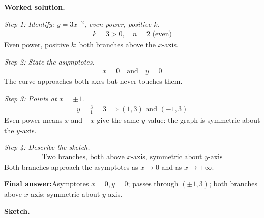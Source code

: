 \documentclass[11pt]{article}
\begin{document}
\textbf{Worked solution.}

\textit{Step 1: Identify: \( y = 3x^{-2} \), even power, positive \( k \).}
\[\begin{gathered}
k = 3 > 0, \quad n = 2 \text{ (even)}
\end{gathered}\]
Even power, positive \( k \): both branches above the \( x \)-axis.

\textit{Step 2: State the asymptotes.}
\[\begin{gathered}
x = 0 \quad \text{and} \quad y = 0
\end{gathered}\]
The curve approaches both axes but never touches them.

\textit{Step 3: Points at \( x = \pm 1 \).}
\[\begin{gathered}
y = \frac{3}{1} = 3 \implies (1, 3) \text{ and } (-1, 3)
\end{gathered}\]
Even power means \( x \) and \( -x \) give the same \( y \)-value: the graph is symmetric about the \( y \)-axis.

\textit{Step 4: Describe the sketch.}
\[\begin{gathered}
\text{Two branches, both above }x\text{-axis, symmetric about }y\text{-axis}
\end{gathered}\]
Both branches approach the asymptotes as \( x \to 0 \) and as \( x \to \pm\infty \).

\begin{answerbox}
\textbf{Final answer:}\quad Asymptotes \(\displaystyle x = 0, y = 0\); passes through \(\displaystyle (\pm 1, 3)\); both branches above \(\displaystyle x\)-axis; symmetric about \(\displaystyle y\)-axis.
\end{answerbox}
\textbf{Sketch.}
\end{document}
